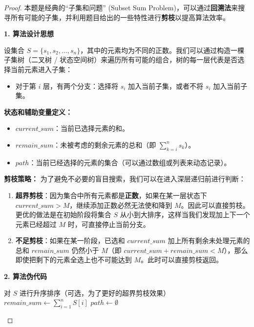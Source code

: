 \documentclass[11pt, a4paper]{article}
\begin{document}
\begin{proof}
    本题是经典的“子集和问题” (Subset Sum Problem)，可以通过\textbf{回溯法}来搜寻所有可能的子集，并利用题目给出的一些特性进行\textbf{剪枝}以提高算法效率。

    \textbf{1. 算法设计思想}

    设集合 $S = \{s_1, s_2, \dots, s_n\}$，其中的元素均为不同的正数。我们可以通过构造一棵子集树（二叉树 / 状态空间树）来遍历所有可能的组合，树的每一层代表是否选择当前元素进入子集：
    \begin{itemize}
        \item 对于第 $i$ 层，有两个分支：选择将 $s_i$ 加入当前子集，或者不将 $s_i$ 加入当前子集。
    \end{itemize}

    \textbf{状态和辅助变量定义：}
    \begin{itemize}
        \item $current\_sum$：当前已选择元素的和。
        \item $remain\_sum$：未被考虑的剩余元素的总和（即 $\sum_{k=i}^n s_k$）。
        \item $path$：当前已经选择的元素的集合（可以通过数组或列表来动态记录）。
    \end{itemize}

    \textbf{剪枝策略：}
    为了避免不必要的盲目搜索，我们可以在进入深层递归前进行判断：
    \begin{enumerate}
        \item \textbf{超界剪枝}：因为集合中所有元素都是\textbf{正数}，如果在某一层状态下 $current\_sum > M$，继续添加正数必然无法使和降到 $M$。因此可以直接剪枝。更优的做法是在初始阶段将集合 $S$ 从小到大排序，这样当我们发现加上下一个元素已经超过 $M$ 时，可直接停止当前分支。
        \item \textbf{不足剪枝}：如果在某一阶段，已选和 $current\_sum$ 加上所有剩余未处理元素的总和 $remain\_sum$ 仍然小于 $M$（即 $current\_sum + remain\_sum < M$），那么即使把剩下的元素全选上也不可能达到 $M$。此时可以直接剪枝返回。
    \end{enumerate}

    \textbf{2. 算法伪代码}

    \begin{algorithm}[H]
    \caption{子集和问题的回溯搜索算法}
    
    对 $S$ 进行升序排序（可选，为了更好的超界剪枝效果）\;
    $remain\_sum \gets \sum_{i=1}^{n} S[i]$\;
    $path \gets \emptyset$\;
    

\end{algorithm}
\end{proof}
\end{document}
